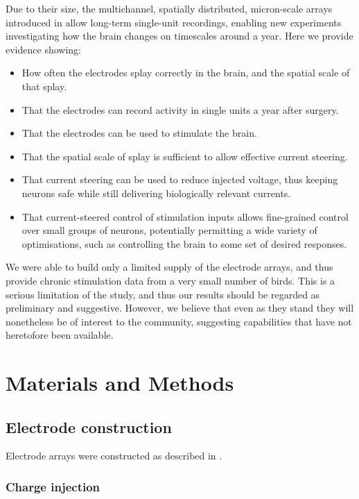 \documentclass[10pt,letterpaper]{article}
\begin{document}
Due to their size, the multichannel, spatially distributed,
micron-scale arrays introduced in \cite{Guitchounts2013electrode}
allow long-term single-unit recordings, enabling new experiments
investigating how the brain changes on timescales around a year. Here
we provide evidence showing:
\begin{itemize}
\item How often the electrodes splay correctly in the brain, and the spatial scale of that splay.
\item That the electrodes can record activity in single units a year after surgery.
\item That the electrodes can be used to stimulate the brain.
\item That the spatial scale of splay is sufficient to allow effective current steering.
  \item That current steering can be used to reduce injected voltage, thus keeping neurons safe while still delivering biologically relevant currents.
\item That current-steered control of stimulation inputs allows
fine-grained control over small groups of neurons, potentially
permitting a wide variety of optimisations, such as controlling the
brain to some set of desired responses.
\end{itemize}

We were able to build only a limited supply of the electrode arrays,
and thus provide chronic stimulation data from a very small number of
birds. This is a serious limitation of the study, and thus our results
should be regarded as preliminary and suggestive. However, we believe
that even as they stand they will nonetheless be of interest to the
community, suggesting capabilities that have not heretofore been
available.




\section{Materials and Methods}

\subsection{Electrode construction}

Electrode arrays were constructed as described in
\cite{Guitchounts2013electrode}.

\subsubsection{Charge injection}
\label{sec:chargeinjection}
\end{document}
